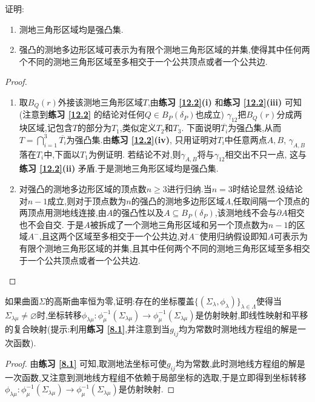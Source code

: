 	\begin{excise}
		证明:\begin{enumerate}[label=(\roman*)]
			\item 测地三角形区域均是强凸集.
			\item 强凸的测地多边形区域可表示为有限个测地三角形区域的并集,使得其中任何两个不同的测地三角形区域至多相交于一个公共顶点或者一个公共边.
		\end{enumerate}
	\end{excise}
	\begin{proof}
		\begin{enumerate}[label=(\roman*)]
			\item 取$B_{Q}(r)$外接该测地三角形区域$T$,由\textbf{练习 \ref{12.2}(i)} 和\textbf{练习 \ref{12.2}(iii)} 可知(注意到\textbf{练习 \ref{12.2}} 的结论对任何$Q\in B_{P}(\delta_{P})$也成立) $\gamma_{12}$把$B_{Q}(r)$分成两块区域,记包含$T$的部分为$T_{1}$,类似定义$T_{2}$和$T_{3}$.
            下面说明$\overline{T_{i}}$为强凸集,从而$\displaystyle T=\bigcap_{i=1}^{3}\overline{T_{i}}$为强凸集.由\textbf{练习 \ref{12.2}(iv)}, 只用证明对$T_{i}$中任意两点$A,B$, $\gamma_{A,B}$落在$T_{i}$中,下面以$T_{1}$为例证明.
            若结论不对,则$\gamma_{A,B}$将与$\gamma_{12}$相交出不只一点, 这与\textbf{练习 \ref{12.2}(ii)} 矛盾.于是测地三角形区域均是强凸集.
			\item 对强凸的测地多边形区域的顶点数$n\geqslant 3$进行归纳.当$n=3$时结论显然.设结论对$n-1$成立,则对于顶点数为$n$的强凸的测地多边形区域$A$,任取间隔一个顶点的两顶点用测地线连接,由$A$的强凸性以及$A\subseteq B_{P}(\delta_{P})$,该测地线不会与$\partial A$相交也不会自交.
            于是$A$被拆成了一个测地三角形区域和另一个顶点数为$n-1$的区域$A^{-}$,且这两个区域至多相交于一个公共边,对$A^{-}$使用归纳假设即知$A$可表示为有限个测地三角形区域的并集,且其中任何两个不同的测地三角形区域至多相交于一个公共顶点或者一个公共边.\qedhere
		\end{enumerate}
	\end{proof}
	\begin{excise}
		如果曲面$\Sigma$的高斯曲率恒为零,证明:存在的坐标覆盖$\{(\Sigma_{\lambda},\phi_{\lambda})\}_{\lambda\in\Lambda}$使得当$\Sigma_{\lambda\mu}\neq\varnothing$时,坐标转移$\phi_{\lambda\mu}:\phi_{\mu}^{-1}(\Sigma_{\lambda\mu})\to\phi_{\mu}^{-1}(\Sigma_{\lambda\mu})$是仿射映射,即线性映射和平移的复合映射(提示:利用\textbf{练习 \ref{8.1}},并注意到当$g_{ij}$均为常数时测地线方程组的解是一次函数).
	\end{excise}
	\begin{proof}
		由\textbf{练习 \ref{8.1}} 可知,取测地法坐标可使$g_{ij}$均为常数,此时测地线方程组的解是一次函数,又注意到测地线方程组不依赖于局部坐标的选取,于是立即得到坐标转移$\phi_{\lambda\mu}:\phi_{\mu}^{-1}(\Sigma_{\lambda\mu})\to\phi_{\mu}^{-1}(\Sigma_{\lambda\mu})$是仿射映射.
	\end{proof}
